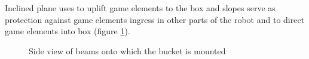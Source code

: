 \begin{enumerate}
	  Inclined plane uses to uplift game elements to the box and slopes serve as protection against game elements ingress in other parts of the robot and to direct game elements into 
	  box (figure \ref{Gripper700}).
      \begin{figure}[H]
      	\begin{minipage}[h]{1\linewidth}
      		\caption{Side view of beams onto which the bucket is mounted}
      		\label{Gripper700}
      	\end{minipage}
      \end{figure}
      

\end{enumerate}

